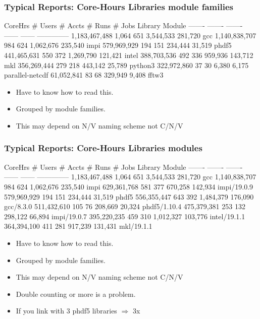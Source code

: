 \documentclass{beamer}
\begin{document}
\begin{frame}[fragile]
    \frametitle{Typical Reports: Core-Hours Libraries module families}
 {\tiny
    \begin{semiverbatim}
      CoreHrs  # Users  # Accts     # Runs  # Jobs   Library Module
      -------  -------  -------     ------  ------   --------------
1,183,467,488    1,064      651  3,544,533  281,720  gcc
1,140,838,707      984      624  1,062,676  235,540  impi
  579,969,929      194      151    234,444  31,519   phdf5
  441,465,631      550      372  1,269,790  121,421  intel
  388,703,536      492      336    959,936  143,712  mkl
  356,269,444      279      218    443,142  25,789   python3
  322,972,860       37       30      6,380  6,175    parallel-netcdf
   61,052,841       83       68    329,949  9,408    fftw3
  \end{semiverbatim}
}
  \begin{itemize}
    \item Have to know how to read this.
    \item Grouped by module families.
    \item This may depend on N/V naming scheme not C/N/V
  \end{itemize}
\end{frame}

\begin{frame}[fragile]
    \frametitle{Typical Reports: Core-Hours Libraries modules}
 {\tiny
  \begin{semiverbatim}
      CoreHrs  # Users  # Accts     # Runs  # Jobs   Library Module
      -------  -------  -------     ------  ------   --------------
1,183,467,488    1,064      651  3,544,533  281,720  gcc
1,140,838,707      984      624  1,062,676  235,540  impi
  629,361,768      581      377    670,258  142,934  impi/19.0.9
  579,969,929      194      151    234,444  31,519   phdf5
  556,355,447      643      392  1,484,379  176,090  gcc/8.3.0
  511,432,610      105       76    208,669  20,324   phdf5/1.10.4
  475,379,381      253      132    298,122  66,894   impi/19.0.7
  395,220,235      459      310  1,012,327  103,776  intel/19.1.1
  364,394,100      411      281    917,239  131,431  mkl/19.1.1
  \end{semiverbatim}
}
  \begin{itemize}
    \item Have to know how to read this.
    \item Grouped by module families.
    \item This may depend on N/V naming scheme not C/N/V
    \item Double counting or more is a problem.
    \item If you link with 3 phdf5 libraries $\Rightarrow$ 3x
  \end{itemize}
\end{frame}
\end{document}

